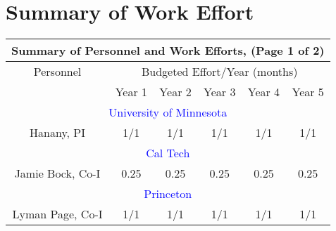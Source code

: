 \documentclass[12pt]{article}
\begin{document}
\newpage
\addtocounter{page}{8}
\section{Summary of Work Effort}
\label{sec:workeffort}

\begin{table}[h] %
\begin{center}
\begin{tabular}{|c|c|c|c|c|c|} \hline 
\multicolumn{6}{|c|}{Summary of Personnel and Work Efforts, (Page 1 of 2)}              \\ \hline
Personnel & \multicolumn{5}{c|}{Budgeted Effort/Year (months)}  \\ \cline{2-6}
                 & Year 1  & Year 2 & Year 3 & Year 4   & Year 5   \\ \hline
\multicolumn{6}{|c|}{\textcolor{blue}{University of Minnesota } }              \\ \hline
Hanany,  PI              & 1/1  & 1/1 & 1/1 & 1/1 & 1/1  \\ \hline
\multicolumn{6}{|c|}{\textcolor{blue}{Cal Tech } } \\ \hline
Jamie Bock, Co-I           &  0.25  & 0.25 & 0.25 & 0.25 & 0.25  \\ \hline
\multicolumn{6}{|c|}{\textcolor{blue}{Princeton} }  \\ \hline
Lyman Page, Co-I           & 1/1  & 1/1  & 1/1  & 1/1   & 1/1  \\ \hline

\end{tabular}
\end{center}
\end{table}
\end{document}
